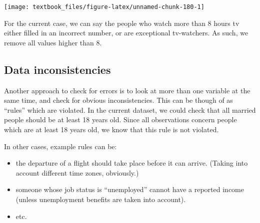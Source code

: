 \documentclass[]{tufte-book}
\newenvironment{Shaded}{}{}
\newcommand{\DataTypeTok}[1]{\textcolor[rgb]{0.56,0.13,0.00}{#1}}
\newcommand{\DecValTok}[1]{\textcolor[rgb]{0.25,0.63,0.44}{#1}}
\newcommand{\KeywordTok}[1]{\textcolor[rgb]{0.00,0.44,0.13}{\textbf{#1}}}
\newcommand{\NormalTok}[1]{#1}
\newcommand{\OperatorTok}[1]{\textcolor[rgb]{0.40,0.40,0.40}{#1}}
\newcommand{\OtherTok}[1]{\textcolor[rgb]{0.00,0.44,0.13}{#1}}
\newcommand{\StringTok}[1]{\textcolor[rgb]{0.25,0.44,0.63}{#1}}
\providecommand{\tightlist}{%
  \setlength{\itemsep}{0pt}\setlength{\parskip}{0pt}}
\begin{document}
\begin{Shaded}
\end{Shaded}

\texttt{[image: textbook\_files/figure-latex/unnamed-chunk-180-1]}

For the current case, we can say the people who watch more than 8 hours tv either filled in an incorrect number, or are exceptional tv-watchers. As such, we remove all values higher than 8.

\begin{Shaded}
\end{Shaded}

\hypertarget{data-inconsistencies}{%
\subsection{Data inconsistencies}\label{data-inconsistencies}}

Another approach to check for errors is to look at more than one variable at the same time, and check for obvious inconsistencies. This can be though of as ``rules'' which are violated. In the current dataset, we could check that all married people should be at least 18 years old. Since all observations concern people which are at least 18 years old, we know that this rule is not violated.

In other cases, example rules can be:

\begin{itemize}
\tightlist
\item
  the departure of a flight should take place before it can arrive. (Taking into account different time zones, obviously.)
\item
  someone whose job status is ``unemployed'' cannot have a reported income (unless unemployment benefits are taken into account).
\item
  etc.
\end{itemize}
\end{document}
